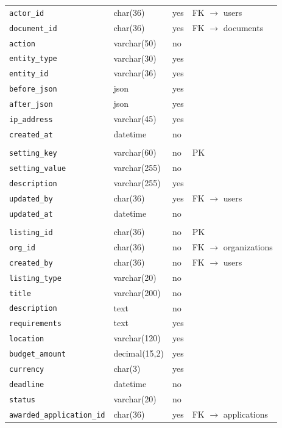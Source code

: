 \documentclass[11pt,a4paper]{report}
\begin{document}
{\begin{longtable}{L{4.2cm}L{3.4cm}L{1.1cm}L{5.0cm}}
\texttt{actor\_id} & char(36) & yes & FK $\rightarrow$ users\\
\texttt{document\_id} & char(36) & yes & FK $\rightarrow$ documents\\
\texttt{action} & varchar(50) & no & \\
\texttt{entity\_type} & varchar(30) & yes & \\
\texttt{entity\_id} & varchar(36) & yes & \\
\texttt{before\_json} & json & yes & \\
\texttt{after\_json} & json & yes & \\
\texttt{ip\_address} & varchar(45) & yes & \\
\texttt{created\_at} & datetime & no & \\
\\
\texttt{setting\_key} & varchar(60) & no & PK\\
\texttt{setting\_value} & varchar(255) & no & \\
\texttt{description} & varchar(255) & yes & \\
\texttt{updated\_by} & char(36) & yes & FK $\rightarrow$ users\\
\texttt{updated\_at} & datetime & no & \\
\\
\texttt{listing\_id} & char(36) & no & PK\\
\texttt{org\_id} & char(36) & no & FK $\rightarrow$ organizations\\
\texttt{created\_by} & char(36) & no & FK $\rightarrow$ users\\
\texttt{listing\_type} & varchar(20) & no & \\
\texttt{title} & varchar(200) & no & \\
\texttt{description} & text & no & \\
\texttt{requirements} & text & yes & \\
\texttt{location} & varchar(120) & yes & \\
\texttt{budget\_amount} & decimal(15,2) & yes & \\
\texttt{currency} & char(3) & yes & \\
\texttt{deadline} & datetime & no & \\
\texttt{status} & varchar(20) & no & \\
\texttt{awarded\_application\_id} & char(36) & yes & FK $\rightarrow$ applications\\

\end{longtable}}
\end{document}
